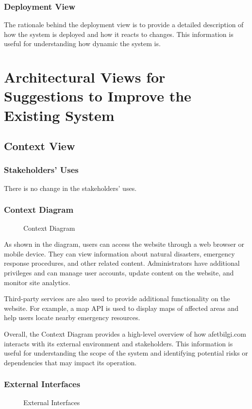 \documentclass[a4paper]{article}
\begin{document}
    \subsubsection{Deployment View}
    The rationale behind the deployment view is to provide a detailed description of how the system is deployed and how it reacts
    to changes. This information is useful for understanding how dynamic the system is.

    \section{Architectural Views for Suggestions to Improve the Existing System}
    \subsection{Context View}
    \subsubsection{Stakeholders' Uses}
    There is no change in the stakeholders' uses.
    \subsubsection{Context Diagram} %
    \begin{figure}
    
    \caption{Context Diagram}
    \end{figure}
        As shown in the diagram, users can access the website through a web browser or mobile device. They can view information about
        natural disasters, emergency response procedures, and other related content. Administrators have additional privileges and can
        manage user accounts, update content on the website, and monitor site analytics.

        Third-party services are also used to provide additional functionality on the website. For example, a map API is used to
        display maps of affected areas and help users locate nearby emergency resources.

        Overall, the Context Diagram provides a high-level overview of how afetbilgi.com interacts with its external environment and
        stakeholders. This information is useful for understanding the scope of the system and identifying potential risks or
        dependencies that may impact its operation.

    \subsubsection{External Interfaces}
    \begin{figure}
    
    \caption{External Interfaces}
    \end{figure}
\end{document}
